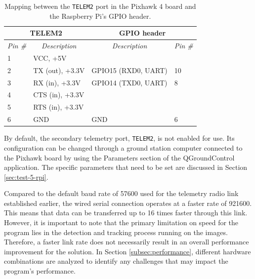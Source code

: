 \begin{table}[ht]
\centering
\begin{tabular}{|ll||ll|}
\hline
\multicolumn{2}{|c||}{\textbf{TELEM2}}                                             & \multicolumn{2}{c|}{\textbf{GPIO header}}                                        \\ \hline \hline
\multicolumn{1}{|c|}{\textit{Pin \#}} & \multicolumn{1}{c||}{\textit{Description}} & \multicolumn{1}{c|}{\textit{Description}} & \multicolumn{1}{c|}{\textit{Pin \#}} \\ \hline
\multicolumn{1}{|l|}{1}               & VCC, +5V                                  & \multicolumn{1}{l|}{}                     &                                      \\ \hline
\multicolumn{1}{|l|}{2}               & TX (out), +3.3V                           & \multicolumn{1}{l|}{GPIO15 (RXD0, UART)}  & 10                                   \\ \hline
\multicolumn{1}{|l|}{3}               & RX (in), +3.3V                            & \multicolumn{1}{l|}{GPIO14 (TXD0, UART)}  & 8                                    \\ \hline
\multicolumn{1}{|l|}{4}               & CTS (in), +3.3V                           & \multicolumn{1}{l|}{}                     &                                      \\ \hline
\multicolumn{1}{|l|}{5}               & RTS (in), +3.3V                           & \multicolumn{1}{l|}{}                     &                                      \\ \hline
\multicolumn{1}{|l|}{6}               & GND                                       & \multicolumn{1}{l|}{GND}                  & 6                                    \\ \hline
\end{tabular}
\caption{Mapping between the \texttt{TELEM2} port in the Pixhawk 4 board and the Raspberry Pi's GPIO header.}
\label{tab:wiring-telem}
\end{table}

By default, the secondary telemetry port, \texttt{TELEM2}, is not enabled for use.
Its configuration can be changed through a ground station computer connected to the Pixhawk board by using the Parameters section of the QGroundControl application.
The specific parameters that need to be set are discussed in Section \ref{sec:test-5-rpi}.


Compared to the default baud rate of 57600 used for the telemetry radio link established earlier, the wired serial connection operates at a faster rate of 921600. This means that data can be transferred up to 16 times faster through this link. However, it is important to note that the primary limitation on speed for the program lies in the detection and tracking process running on the images. Therefore, a faster link rate does not necessarily result in an overall performance improvement for the solution. In Section  \ref{subsec:performance}, different hardware combinations are analyzed to identify any challenges that may impact the program's performance.

